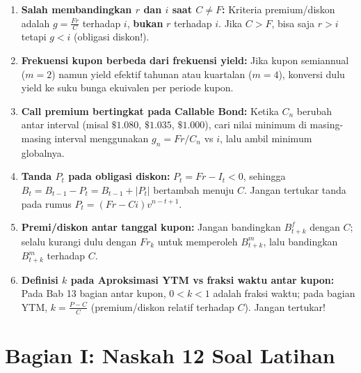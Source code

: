 \documentclass[11pt,a4paper]{article}
\begin{document}
\begin{jebakanbox}
\small
\begin{enumerate}[leftmargin=5mm, topsep=1pt, itemsep=1.5pt]
    \item \textbf{Salah membandingkan $r$ dan $i$ saat $C \neq F$:} Kriteria premium/diskon adalah $g = \frac{Fr}{C}$ terhadap $i$, \textbf{bukan} $r$ terhadap $i$. Jika $C > F$, bisa saja $r > i$ tetapi $g < i$ (obligasi diskon!).
    \item \textbf{Frekuensi kupon berbeda dari frekuensi yield:} Jika kupon semiannual ($m=2$) namun yield efektif tahunan atau kuartalan ($m=4$), konversi dulu yield ke suku bunga ekuivalen per periode kupon.
    \item \textbf{Call premium bertingkat pada Callable Bond:} Ketika $C_n$ berubah antar interval (misal $\$1.080$, $\$1.035$, $\$1.000$), cari nilai minimum di masing-masing interval menggunakan $g_n = Fr/C_n$ vs $i$, lalu ambil minimum globalnya.
    \item \textbf{Tanda $P_t$ pada obligasi diskon:} $P_t = Fr - I_t < 0$, sehingga $B_t = B_{t-1} - P_t = B_{t-1} + |P_t|$ bertambah menuju $C$. Jangan tertukar tanda pada rumus $P_t = (Fr - Ci)v^{n-t+1}$.
    \item \textbf{Premi/diskon antar tanggal kupon:} Jangan bandingkan $B_{t+k}^f$ dengan $C$; selalu kurangi dulu dengan $Fr_k$ untuk memperoleh $B_{t+k}^m$, lalu bandingkan $B_{t+k}^m$ terhadap $C$.
    \item \textbf{Definisi $k$ pada Aproksimasi YTM vs fraksi waktu antar kupon:} Pada Bab 13 bagian antar kupon, $0 < k < 1$ adalah fraksi waktu; pada bagian YTM, $k = \frac{P-C}{C}$ (premium/diskon relatif terhadap $C$). Jangan tertukar!
\end{enumerate}
\end{jebakanbox}

\newpage

\section*{\color{primaryblue} Bagian I: Naskah 12 Soal Latihan}
\end{document}
